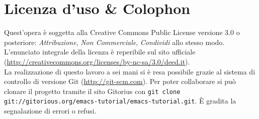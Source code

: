 \documentclass[11pt,a4paper]{article}
\begin{document}
\vfill
{}
{}
\section*{Licenza d'uso \& Colophon}
\label{sec:lic}

Quest'opera è soggetta alla Creative Commons Public License versione 3.0 o
posteriore: \emph{Attribuzione}, \emph{Non Commerciale}, \emph{Condividi} allo
stesso modo. L'enunciato integrale della licenza è reperibile sul sito ufficiale
(\url{http://creativecommons.org/licenses/by-nc-sa/3.0/deed.it}).\\%

\noindent La realizzazione di questo lavoro a sei mani si è resa possibile
grazie al sistema di controllo di versione Git (\url{http://git-scm.com}). Per
poter collaborare si può clonare il progetto tramite il sito Gitorius con %
\verb!git clone git://gitorious.org/emacs-tutorial/emacs-tutorial.git!. È
gradita la segnalazione di errori o refusi.
\end{document}
